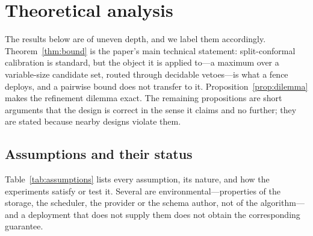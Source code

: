 \section{Theoretical analysis}\label{sec:theory}

The results below are of uneven depth, and we label them accordingly. Theorem~\ref{thm:bound} is the paper's main technical statement: split-conformal calibration is standard, but the object it is applied to---a maximum over a variable-size candidate set, routed through decidable vetoes---is what a fence deploys, and a pairwise bound does not transfer to it. Proposition~\ref{prop:dilemma} makes the refinement dilemma exact. The remaining propositions are short arguments that the design is correct in the sense it claims and no further; they are stated because nearby designs violate them.

\subsection{Assumptions and their status}\label{sec:assumptions}

Table~\ref{tab:assumptions} lists every assumption, its nature, and how the experiments satisfy or test it. Several are environmental---properties of the storage, the scheduler, the provider or the schema author, not of the algorithm---and a deployment that does not supply them does not obtain the corresponding guarantee.

